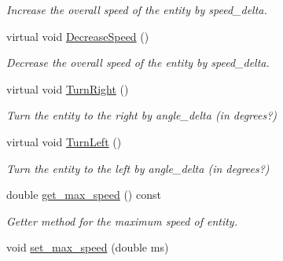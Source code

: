\begin{DoxyCompactItemize}
\begin{DoxyCompactList}\small\item\em Increase the overall speed of the entity by speed\+\_\+delta. \end{DoxyCompactList}\item 
virtual void \hyperlink{classMotionHandler_a25ad77fb1a4c79f8303a256b7e1cbc9c}{Decrease\+Speed} ()\hypertarget{classMotionHandler_a25ad77fb1a4c79f8303a256b7e1cbc9c}{}\label{classMotionHandler_a25ad77fb1a4c79f8303a256b7e1cbc9c}

\begin{DoxyCompactList}\small\item\em Decrease the overall speed of the entity by speed\+\_\+delta. \end{DoxyCompactList}\item 
virtual void \hyperlink{classMotionHandler_a22b99a21307a534165d811740d8aeac1}{Turn\+Right} ()\hypertarget{classMotionHandler_a22b99a21307a534165d811740d8aeac1}{}\label{classMotionHandler_a22b99a21307a534165d811740d8aeac1}

\begin{DoxyCompactList}\small\item\em Turn the entity to the right by angle\+\_\+delta (in degrees?) \end{DoxyCompactList}\item 
virtual void \hyperlink{classMotionHandler_a922e3dd8c6a98b54607837c5e669c557}{Turn\+Left} ()\hypertarget{classMotionHandler_a922e3dd8c6a98b54607837c5e669c557}{}\label{classMotionHandler_a922e3dd8c6a98b54607837c5e669c557}

\begin{DoxyCompactList}\small\item\em Turn the entity to the left by angle\+\_\+delta (in degrees?) \end{DoxyCompactList}\item 
double \hyperlink{classMotionHandler_a4024f3b5562b5e49bfaeab9f82c0762b}{get\+\_\+max\+\_\+speed} () const \hypertarget{classMotionHandler_a4024f3b5562b5e49bfaeab9f82c0762b}{}\label{classMotionHandler_a4024f3b5562b5e49bfaeab9f82c0762b}

\begin{DoxyCompactList}\small\item\em Getter method for the maximum speed of entity. \end{DoxyCompactList}\item 
void \hyperlink{classMotionHandler_a32e832d35e73e9db85c16b3ff569196e}{set\+\_\+max\+\_\+speed} (double ms)\hypertarget{classMotionHandler_a32e832d35e73e9db85c16b3ff569196e}{}\label{classMotionHandler_a32e832d35e73e9db85c16b3ff569196e}


\end{DoxyCompactItemize}
